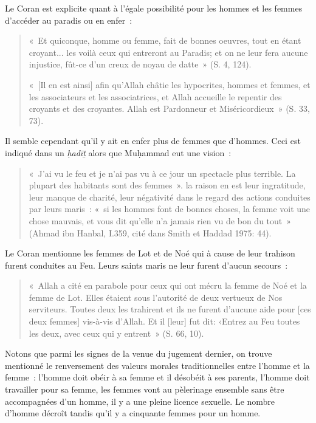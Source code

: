 Le Coran est explicite quant à l'égale possibilité pour les hommes et
les femmes d'accéder au paradis ou en enfer~:
\begin{quote}
    «~Et quiconque, homme ou femme, fait de bonnes oeuvres, tout en étant
croyant... les voilà ceux qui entreront au Paradis; et on ne leur fera
aucune injustice, fût-ce d'un creux de noyau de datte~» (S. 4, 124).



«~{[}Il en est ainsi{]} afin qu'Allah châtie les hypocrites, hommes et
femmes, et les associateurs et les associatrices, et Allah accueille le
repentir des croyants et des croyantes. Allah est Pardonneur et
Miséricordieux~» (S. 33, 73).
\end{quote}
Il semble cependant qu'il y ait en enfer plus de femmes que d'hommes.
Ceci est indiqué dans un \emph{ḥadīṯ} alors que Muḥammad eut une
vision~: 
\begin{quote}
    «~J'ai vu le feu et je n'ai pas vu à ce jour un spectacle plus
terrible. La plupart des habitants sont des femmes~». la raison en est
leur ingratitude, leur manque de charité, leur négativité dans le regard
des actions conduites par leurs maris~: «~si les hommes font de bonnes
choses, la femme voit une chose mauvais, et vous dit qu'elle n'a jamais
rien vu de bon du tout~» (Ahmad ibn Hanbal, I.359, cité dans Smith et
Haddad 1975: 44).
\end{quote}


Le Coran mentionne les femmes de Lot et de Noé qui à cause de leur
trahison furent conduites au Feu. Leurs saints maris ne leur furent
d'aucun secours~: 
\begin{quote}
    «~Allah a cité en parabole pour ceux qui ont mécru la
femme de Noé et la femme de Lot. Elles étaient sous l'autorité de deux
vertueux de Nos serviteurs. Toutes deux les trahirent et ils ne furent
d'aucune aide pour {[}ces deux femmes{]} vis-à-vis d'Allah. Et il
{[}leur{]} fut dit: ‹Entrez au Feu toutes les deux, avec ceux qui y
entrent~» (S. 66, 10).
\end{quote}


Notons que parmi les signes de la venue du jugement dernier, on trouve
mentionné le renversement des valeurs morales traditionnelles entre
l'homme et la femme~: l'homme doit obéir à sa femme et il désobéit à ses
parents, l'homme doit travailler pour sa femme, les femmes vont au
pèlerinage ensemble sans être accompagnées d'un homme, il y a une pleine
licence sexuelle. Le nombre d'homme décroît tandis qu'il y a cinquante
femmes pour un homme.

